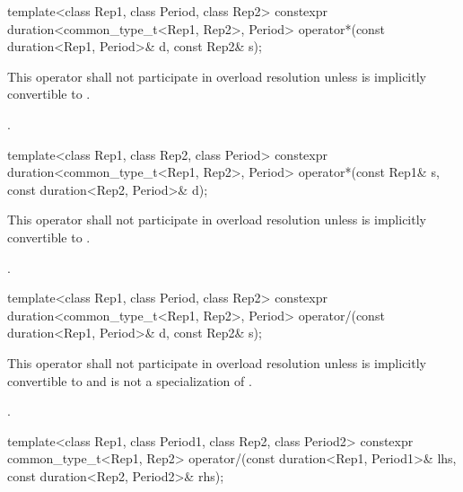 %
\begin{itemdecl}
template<class Rep1, class Period, class Rep2>
  constexpr duration<common_type_t<Rep1, Rep2>, Period>
    operator*(const duration<Rep1, Period>& d, const Rep2& s);
\end{itemdecl}

\begin{itemdescr}
\pnum
\remarks
This operator shall not participate in overload
resolution unless  is implicitly convertible to .

\pnum
\returns
{}.
\end{itemdescr}

%
\begin{itemdecl}
template<class Rep1, class Rep2, class Period>
  constexpr duration<common_type_t<Rep1, Rep2>, Period>
    operator*(const Rep1& s, const duration<Rep2, Period>& d);
\end{itemdecl}

\begin{itemdescr}
\pnum
\remarks
This operator shall not participate in overload
resolution unless  is implicitly convertible to .

\pnum
\returns
{}.
\end{itemdescr}

%
\begin{itemdecl}
template<class Rep1, class Period, class Rep2>
  constexpr duration<common_type_t<Rep1, Rep2>, Period>
    operator/(const duration<Rep1, Period>& d, const Rep2& s);
\end{itemdecl}

\begin{itemdescr}
\pnum
\remarks
This operator shall not participate in overload
resolution unless  is implicitly convertible to 
and  is not a specialization of .

\pnum
\returns
{}.
\end{itemdescr}

%
\begin{itemdecl}
template<class Rep1, class Period1, class Rep2, class Period2>
  constexpr common_type_t<Rep1, Rep2>
    operator/(const duration<Rep1, Period1>& lhs, const duration<Rep2, Period2>& rhs);
\end{itemdecl}

